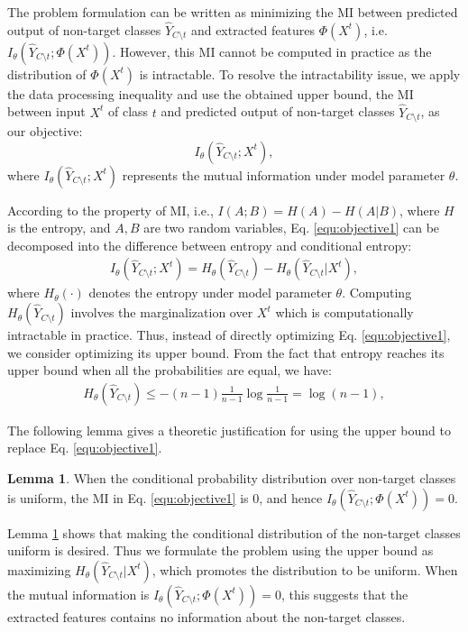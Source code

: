 \documentclass{article}
\theoremstyle{definition}
\newtheorem{lemma}{Lemma}
\begin{document}
The problem formulation can be written as minimizing the MI between predicted output of non-target classes $\hat{Y}_{C\setminus t}$ and extracted features $\Phi(X^t)$, i.e. $I_{\theta}(\hat{Y}_{C\setminus t};\Phi(X^t))$. However, this MI cannot be computed in practice as the distribution of $\Phi(X^t)$ is intractable. To resolve the intractability issue, we apply the data processing inequality \cite{information_theory} and use the obtained upper bound, the MI between input $X^t$ of class $t$ and predicted output of non-target classes $\hat{Y}_{C\setminus t}$, as our objective:
\begin{equation}
    I_{\theta}(\hat{Y}_{C\setminus t};X^t),
    \label{equ:objective1}
\end{equation}
where $I_{\theta}(\hat{Y}_{C\setminus t};X^t)$ represents the mutual information under model parameter $\theta$.

According to the property of MI, i.e., $I(A;B)= H(A) - H(A|B)$, where $H$ is the entropy, and $A, B$ are two random variables, Eq. \ref{equ:objective1} can be decomposed into the difference between entropy and conditional entropy:
\begin{align}\nonumber
   I_{\theta}(\hat{Y}_{C\setminus t};X^t) = H_{\theta}(\hat{Y}_{C\setminus t}) - H_{\theta}(\hat{Y}_{C\setminus t}|X^t),
\end{align}
where $H_{\theta}(\cdot)$ denotes the entropy under model parameter $\theta$. Computing $H_{\theta}(\hat{Y}_{C\setminus t})$ involves the marginalization over $X^t$ which is computationally intractable in practice. Thus, instead of directly optimizing Eq. \ref{equ:objective1}, we consider optimizing its upper bound. From the fact that entropy reaches its upper bound when all the probabilities are equal, we have:
\begin{align*}\nonumber
    H_{\theta}(\hat{Y}_{C\setminus t}) \leq -(n-1)\frac{1}{n-1}\log\frac{1}{n-1}  = \log{(n-1)},
\end{align*}


The following lemma gives a theoretic justification for using the upper bound to replace Eq. \ref{equ:objective1}.
\begin{lemma}\label{lemma1}
    When the conditional probability distribution over non-target classes is uniform, the MI in Eq. \ref{equ:objective1} is 0, and hence $I_{\theta}(\hat{Y}_{C\setminus t};\Phi(X^t))=0$.
\end{lemma}

Lemma \ref{lemma1} shows that making the conditional distribution of the non-target classes uniform is desired. Thus we formulate the problem using the upper bound as maximizing $H_{\theta}(\hat{Y}_{C\setminus t}|X^t)$, which promotes the distribution to be uniform. When the mutual information is $I_{\theta}(\hat{Y}_{C\setminus t};\Phi(X^t))=0$, this suggests that the extracted features contains no information about the non-target classes.
\end{document}
